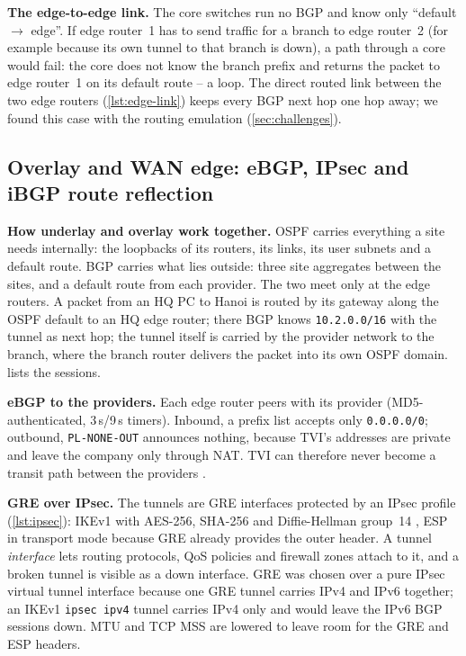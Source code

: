 \textbf{The edge-to-edge link.} The core switches run no BGP and know only ``default $\rightarrow$ edge''. If
edge router~1 has to send traffic for a branch to edge router~2 (for example because its own tunnel to that
branch is down), a path through a core would fail: the core does not know the branch prefix and returns the
packet to edge router~1 on its default route -- a loop. The direct routed link between the two edge routers
(\cref{lst:edge-link}) keeps every BGP next hop one hop away; we found this case with the routing
emulation (\cref{sec:challenges}).

\subsection{Overlay and WAN edge: eBGP, IPsec and iBGP route reflection}\label{sec:overlay}
\textbf{How underlay and overlay work together.} OSPF carries everything a site needs internally: the
loopbacks of its routers, its links, its user subnets and a default route. BGP carries what lies outside:
three site aggregates between the sites, and a default route from each provider. The two meet only at the
edge routers. A packet from an HQ PC to Hanoi is routed by its gateway along the OSPF default to an HQ edge
router; there BGP knows \texttt{10.2.0.0/16} with the tunnel as next hop; the tunnel itself is carried by
the provider network to the branch, where the branch router delivers the packet into its own OSPF domain.
 lists the sessions.



\textbf{eBGP to the providers.} Each edge router peers with its provider (MD5-authenticated, 3\,s/9\,s
timers). Inbound, a prefix list accepts only \texttt{0.0.0.0/0}; outbound, \texttt{PL-NONE-OUT} announces
nothing, because TVI's addresses are private and leave the company only through NAT. TVI can therefore
never become a transit path between the providers \cite{rfc4271}.

\textbf{GRE over IPsec.} The tunnels are GRE interfaces protected by an IPsec profile
(\cref{lst:ipsec}): IKEv1 with AES-256, SHA-256 and Diffie-Hellman group~14 \cite{rfc2409,rfc4301}, ESP in
transport mode because GRE already provides the outer header. A tunnel \emph{interface} lets routing
protocols, QoS policies and firewall zones attach to it, and a broken tunnel is visible as a down
interface. GRE was chosen over a pure IPsec virtual tunnel interface because one GRE tunnel carries IPv4 and
IPv6 together; an IKEv1 \texttt{ipsec ipv4} tunnel carries IPv4 only and would leave the IPv6 BGP sessions
down. MTU and TCP MSS are lowered to leave room for the GRE and ESP headers.

